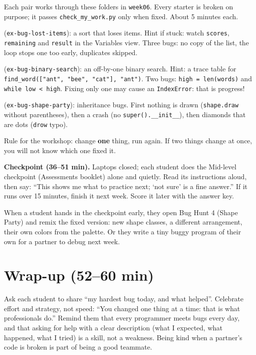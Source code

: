 \begin{bughunt}
Each pair works through these folders in \texttt{week06}. Every starter is broken on purpose; it passes \texttt{check\_my\_work.py} only when fixed. About 5 minutes each.
\begin{description}[itemsep=2pt,font=\normalfont\bfseries]
  \item[Bug Hunt 2, Lost Scores] (\texttt{ex-bug-lost-items}): a sort that loses items. Hint if stuck: watch \texttt{scores}, \texttt{remaining} and \texttt{result} in the Variables view. Three bugs: no copy of the list, the loop stops one too early, duplicates skipped.
  \item[Bug Hunt 3, Word Finder] (\texttt{ex-bug-binary-search}): an off-by-one binary search. Hint: a trace table for \texttt{find\_word(["ant", "bee", "cat"], "ant")}. Two bugs: \texttt{high = len(words)} and \texttt{while low < high}. Fixing only one may cause an \texttt{IndexError}: that is progress!
  \item[Bug Hunt 4, Shape Party] (\texttt{ex-bug-shape-party}): inheritance bugs. First nothing is drawn (\texttt{shape.draw} without parentheses), then a crash (no \texttt{super().\_\_init\_\_}), then diamonds that are dots (\texttt{drow} typo).
\end{description}
Rule for the workshop: change \textbf{one} thing, run again. If two things change at once, you will not know which one fixed it.
\end{bughunt}

\textbf{Checkpoint (36--51 min).} Laptops closed; each student does the Mid-level checkpoint (Assessments booklet) alone and quietly. Read its instructions aloud, then say: \enquote{This shows me what to practice next; \enquote{not sure} is a fine answer.} If it runs over 15 minutes, finish it next week. Score it later with the answer key.

\begin{freebuild}
When a student hands in the checkpoint early, they open Bug Hunt 4 (Shape Party) and remix the fixed version: new shape classes, a different arrangement, their own colors from the palette. Or they write a tiny buggy program of their own for a partner to debug next week.
\end{freebuild}

\section{Wrap-up (52--60 min)}
\begin{safety}
Ask each student to share \enquote{my hardest bug today, and what helped}. Celebrate effort and strategy, not speed: \enquote{You changed one thing at a time: that is what professionals do.} Remind them that every programmer meets bugs every day, and that asking for help with a clear description (what I expected, what happened, what I tried) is a skill, not a weakness. Being kind when a partner's code is broken is part of being a good teammate.
\end{safety}

